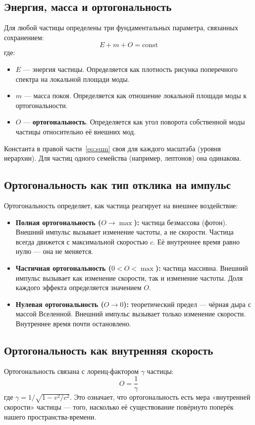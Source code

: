 \documentclass[12pt,a4paper]{article}
\begin{document}
\subsection{Энергия, масса и ортогональность}

Для любой частицы определены три фундаментальных параметра, связанных сохранением:
\begin{equation}
    E + m + O = \text{const}
    \label{eq:sum}
\end{equation}
где:
\begin{itemize}
    \item $E$ --- энергия частицы. Определяется как плотность рисунка поперечного спектра на локальной площади моды.
    \item $m$ --- масса покоя. Определяется как отношение локальной площади моды к ортогональности.
    \item $O$ --- \textbf{ортогональность}. Определяется как угол поворота собственной моды частицы относительно её внешних мод.
\end{itemize}

Константа в правой части~\eqref{eq:sum} своя для каждого масштаба (уровня иерархии). Для частиц одного семейства (например, лептонов) она одинакова.

\subsection{Ортогональность как тип отклика на импульс}
Ортогональность определяет, как частица реагирует на внешнее воздействие:
\begin{itemize}
    \item \textbf{Полная ортогональность ($O \to \max$):} частица безмассова (фотон). Внешний импульс вызывает изменение частоты, а не скорости. Частица всегда движется с максимальной скоростью $c$. Её внутреннее время равно нулю --- она не меняется.
    \item \textbf{Частичная ортогональность ($0 < O < \max$):} частица массивна. Внешний импульс вызывает как изменение скорости, так и изменение частоты. Доля каждого эффекта определяется значением $O$.
    \item \textbf{Нулевая ортогональность ($O \to 0$):} теоретический предел --- чёрная дыра с массой Вселенной. Внешний импульс вызывает только изменение скорости. Внутреннее время почти остановлено.
\end{itemize}

\subsection{Ортогональность как внутренняя скорость}
Ортогональность связана с лоренц-фактором $\gamma$ частицы:
\begin{equation}
    O = \frac{1}{\gamma}
    \label{eq:ogamma}
\end{equation}
где $\gamma = 1/\sqrt{1 - v^2/c^2}$. Это означает, что ортогональность есть мера «внутренней скорости» частицы --- того, насколько её существование повёрнуто поперёк нашего пространства-времени.
\end{document}
